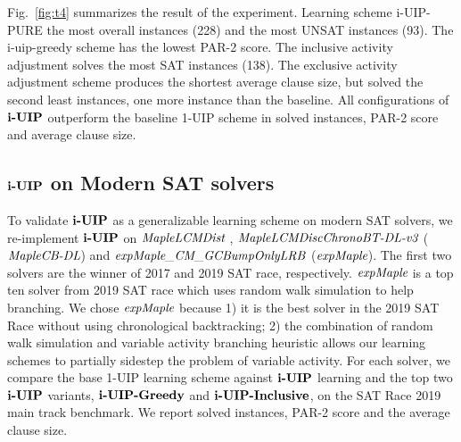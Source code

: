 Fig.~\ref{fig:t4} summarizes the result of the experiment. Learning scheme i-UIP-PURE the most overall instances (228) and the most UNSAT instances (93). The i-uip-greedy scheme has the lowest PAR-2 score. The inclusive activity adjustment solves the most SAT instances (138). The exclusive activity adjustment scheme produces the shortest average clause size, but solved the second least instances, one more instance than the baseline. All configurations of $\textbf{i-UIP}$ outperform the baseline 1-UIP scheme in solved instances, PAR-2 score and average clause size.





\subsection{$\textbf{i-UIP}$ on Modern SAT solvers}
To validate $\textbf{i-UIP}$ as a generalizable learning scheme on modern SAT solvers, we re-implement $\textbf{i-UIP}$ on $\textit{MapleLCMDist}$ \cite{},  $\textit{MapleLCMDiscChronoBT-DL-v3}$ \cite{}($\textit{MapleCB-DL}$) and $\textit{expMaple\_CM\_GCBumpOnlyLRB}$\cite{} ($\textit{expMaple}$).  
The first two solvers are the winner of 2017 and 2019 SAT race, respectively.  $\textit{expMaple}$ is a top ten solver from 2019 SAT race which uses random walk simulation to help branching. We chose $\textit{expMaple}$ because 1) it is the best solver in the 2019 SAT Race without using chronological backtracking; 2) the combination of random walk simulation and variable activity branching heuristic allows our learning schemes to partially sidestep the problem of variable activity. For each solver, we compare the base 1-UIP learning scheme against $\textbf{i-UIP}$ learning and the top two $\textbf{i-UIP}$ variants, $\textbf{i-UIP-Greedy}$ and $\textbf{i-UIP-Inclusive}$, on the SAT Race 2019 main track benchmark. We report solved instances, PAR-2 score and the average clause size.

